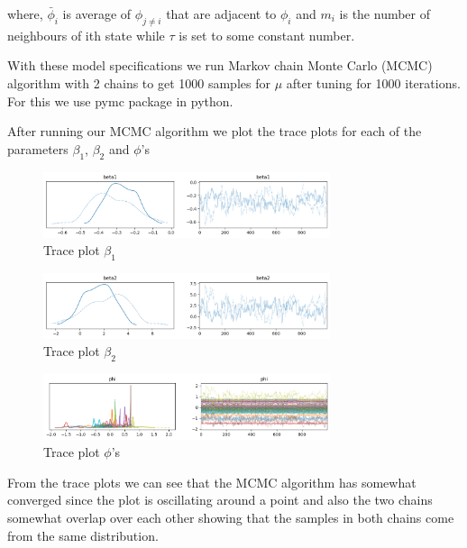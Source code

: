 \documentclass[enabledeprecatedfontcommands,parskip=half,twoside=semi,BCOR=0mm]{scrreprt}
\numberwithin{equation}{chapter}
\theoremstyle{definition}
\theoremstyle{remark}
\begin{document}
    where,
    \(\bar{\phi}_i\) is average of \(\phi_{j \neq i}\) that are adjacent to \(\phi_i\) and \(m_i\) is the number of neighbours of ith state while \(\tau\) is set to some constant number.
    
    With these model specifications we run Markov chain Monte Carlo (MCMC) algorithm with 2 chains to get 1000 samples for \(\mu\) after tuning for 1000 iterations. For this we use pymc package in python. 
    
    After running our MCMC algorithm we plot the trace plots for each of the parameters \(\beta_1\), \(\beta_2\) and \(\phi\)'s
    \begin{figure}[h]
    \centering
    \includegraphics[width=0.75\textwidth]{traceplot_beta1.png}
    \caption{Trace plot \(\beta_1\)}
    \label{fig:Figure 4}
    \end{figure}
    \begin{figure}[h]
    \centering
    \includegraphics[width=0.75\textwidth]{traceplot_beta2.png}
    \caption{Trace plot \(\beta_2\)}
    \label{fig:Figure 5}
    \end{figure}
    \begin{figure}[h]
    \centering
    \includegraphics[width=0.75\textwidth]{traceplot_phi.png}
    \caption{Trace plot \(\phi\)'s}
    \label{fig:Figure 6}
    \end{figure}

    From the trace plots we can see that the MCMC algorithm has somewhat converged since the plot is oscillating around a point and also the two chains somewhat overlap over each other showing that the samples in both chains come from the same distribution.
\end{document}
